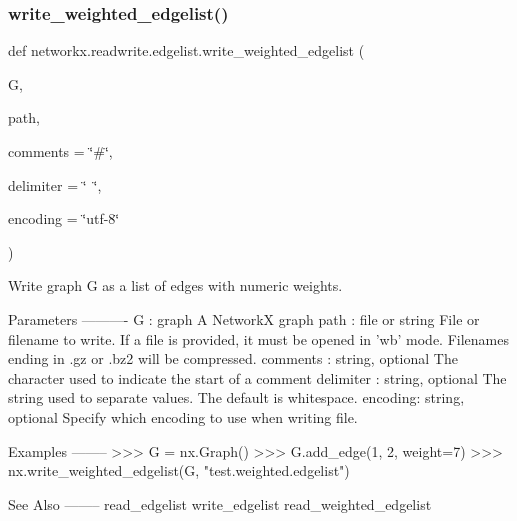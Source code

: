 \subsubsection{\texorpdfstring{write\+\_\+weighted\+\_\+edgelist()}{write\_weighted\_edgelist()}}
{\footnotesize\ttfamily def networkx.\+readwrite.\+edgelist.\+write\+\_\+weighted\+\_\+edgelist (\begin{DoxyParamCaption}\item[{}]{G,  }\item[{}]{path,  }\item[{}]{comments = {\ttfamily \char`\"{}\#\char`\"{}},  }\item[{}]{delimiter = {\ttfamily \char`\"{}~\char`\"{}},  }\item[{}]{encoding = {\ttfamily \char`\"{}utf-\/8\char`\"{}} }\end{DoxyParamCaption})}

\begin{DoxyVerb}Write graph G as a list of edges with numeric weights.

Parameters
----------
G : graph
   A NetworkX graph
path : file or string
   File or filename to write. If a file is provided, it must be
   opened in 'wb' mode.
   Filenames ending in .gz or .bz2 will be compressed.
comments : string, optional
   The character used to indicate the start of a comment
delimiter : string, optional
   The string used to separate values.  The default is whitespace.
encoding: string, optional
   Specify which encoding to use when writing file.

Examples
--------
>>> G = nx.Graph()
>>> G.add_edge(1, 2, weight=7)
>>> nx.write_weighted_edgelist(G, "test.weighted.edgelist")

See Also
--------
read_edgelist
write_edgelist
read_weighted_edgelist
\end{DoxyVerb}
 